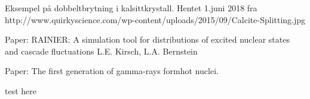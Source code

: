 \documentclass[%
 reprint,
 amsmath,amssymb,
 aps,
 norsk
]{revtex4-1}
\begin{document}

\begin{thebibliography}{9}

Eksempel på dobbeltbrytning i kalsittkrystall. Hentet 1.juni 2018 fra http://www.quirkyscience.com/wp-content/uploads/2015/09/Calcite-Splitting.jpg

 Paper: RAINIER: A simulation tool for distributions of excited nuclear states and cascade fluctuations
L.E. Kirsch, L.A. Bernstein

 Paper: The first generation of gamma-rays formhot nuclei.

 test here

\end{thebibliography}





%
\end{document}
